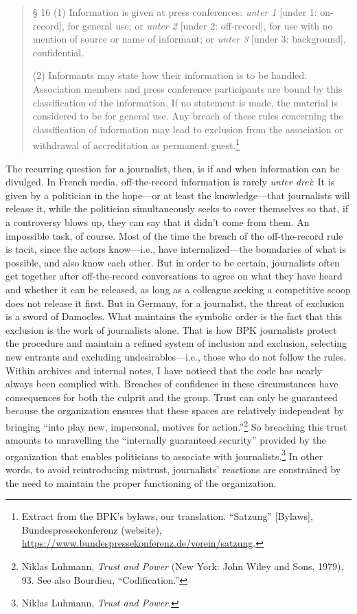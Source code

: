 \documentclass{tufte-handout}
\begin{document}
\begin{quote}
§ 16 (1) Information is given at press conferences: \emph{unter 1}
{[}under 1: on-record{]}, for general use; or \emph{unter 2} {[}under 2:
off-record{]}, for use with no mention of source or name of informant;
or \emph{unter 3} {[}under 3: background{]}, confidential.

(2) Informants may state how their information is to be handled.
Association members and press conference participants are bound by this
classification of the information. If no statement is made, the material
is considered to be for general use. Any breach of these rules
concerning the classification of information may lead to exclusion from
the association or withdrawal of accreditation as permanent
guest.\footnote{Extract from the BPK's bylaws, our translation.
  ``Satzung'' {[}Bylaws{]}, Bundespressekonferenz (website),
  \url{https://www.bundespressekonferenz.de/verein/satzung}.}
\end{quote}

\enlargethispage{\baselineskip}

The recurring question for a journalist, then, is if and when
information can be divulged. In French media, off-the-record information
is rarely \emph{unter drei}: It is given by a politician in the
hope---or at least the knowledge---that journalists will release it,
while the politician simultaneously seeks to cover themselves so that,
if a controversy blows up, they can say that it didn't come from them.
An impossible task, of course. Most of the time the breach of the
off-the-record rule is tacit, since the actors know---i.e., have
internalized---the boundaries of what is possible, and also know each
other. But in order to be certain, journalists often get together after
off-the-record conversations to agree on what they have heard and
whether it can be released, as long as a colleague seeking a competitive
scoop does not release it first. But in Germany, for a journalist, the
threat of exclusion is a sword of Damocles. What maintains the symbolic
order is the fact that this exclusion is the work of journalists alone.
That is how BPK journalists protect the procedure and maintain a refined
system of inclusion and exclusion, selecting new entrants and excluding
undesirables---i.e., those who do not follow the rules. Within archives
and internal notes, I have noticed that the code has nearly always been
complied with. Breaches of confidence in these circumstances have
consequences for both the culprit and the group. Trust can only be
guaranteed because the organization ensures that these spaces are
relatively independent by bringing ``into play new, impersonal, motives
for action.''\footnote{Niklas Luhmann, \emph{Trust and Power} (New York:
  John Wiley and Sons, 1979), 93. See also Bourdieu, ``Codification.''}
So breaching this trust amounts to unravelling the ``internally
guaranteed security'' provided by the organization that enables
politicians to associate with journalists.\footnote{Niklas Luhmann,
  \emph{Trust and Power}.} In other words, to avoid reintroducing
mistrust, journalists' reactions are constrained by the need to maintain
the proper functioning of the organization.
\end{document}
